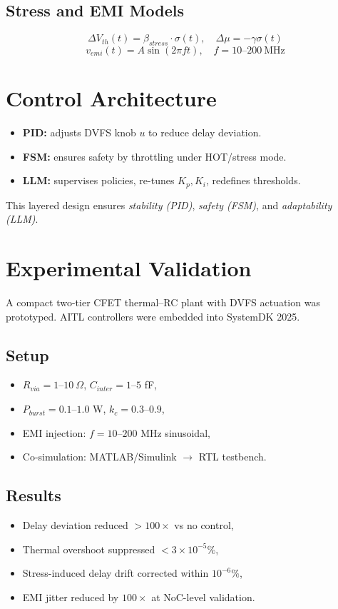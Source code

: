 \documentclass[conference]{IEEEtran}
\begin{document}
\subsection{Stress and EMI Models}
\begin{equation}
\Delta V_{th}(t) = \beta_{stress}\cdot \sigma(t), \quad 
\Delta \mu = -\gamma \sigma(t)
\end{equation}
\begin{equation}
v_{emi}(t) = A\sin(2\pi f t), \quad f=10\text{--}200~\text{MHz}
\end{equation}

\section{Control Architecture}
\begin{itemize}
  \item \textbf{PID:} adjusts DVFS knob $u$ to reduce delay deviation.
  \item \textbf{FSM:} ensures safety by throttling under HOT/stress mode.
  \item \textbf{LLM:} supervises policies, re-tunes $K_p,K_i$, redefines thresholds.
\end{itemize}
This layered design ensures \emph{stability (PID)}, 
\emph{safety (FSM)}, and \emph{adaptability (LLM)}.

\section{Experimental Validation}
A compact two-tier CFET thermal–RC plant with DVFS actuation was prototyped.
AITL controllers were embedded into SystemDK 2025.

\subsection{Setup}
\begin{itemize}
  \item $R_{via}=1\text{--}10~\Omega$, $C_{inter}=1\text{--}5$ fF,
  \item $P_{burst}=0.1\text{--}1.0$ W, $k_c=0.3\text{--}0.9$,
  \item EMI injection: $f=10\text{--}200$ MHz sinusoidal,
  \item Co-simulation: MATLAB/Simulink $\to$ RTL testbench.
\end{itemize}

\subsection{Results}
\begin{itemize}
  \item Delay deviation reduced $>100\times$ vs no control,
  \item Thermal overshoot suppressed $<3\times 10^{-5}\%$,
  \item Stress-induced delay drift corrected within $10^{-6}\%$,
  \item EMI jitter reduced by $100\times$ at NoC-level validation.
\end{itemize}
\end{document}
